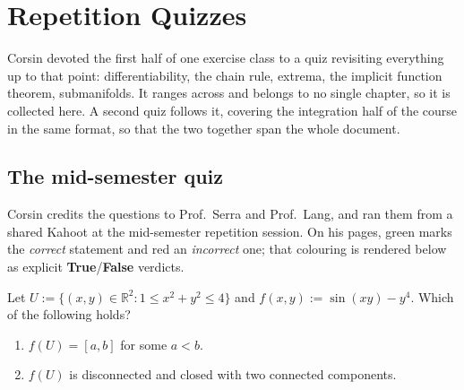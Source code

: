 \chapter{Repetition Quizzes}
\label{ch:repetition_quiz}

Corsin devoted the first half of one exercise class to a quiz revisiting everything up to that
point: differentiability, the chain rule, extrema, the implicit function theorem,
submanifolds. It ranges across  and belongs to no
single chapter, so it is collected here. A second quiz follows it, covering the integration half
of the course in the same format, so that the two together span the whole document.

\section{The mid-semester quiz}
\label{sec:repetition_quiz}

\begin{ainote}
Corsin credits the questions to Prof.\ Serra and Prof.\ Lang, and ran them from a shared Kahoot
at the mid-semester repetition session. On his pages, \textcolor{green!60!black}{green} marks the
\emph{correct} statement and \textcolor{red!80!black}{red} an \emph{incorrect} one; that colouring
is rendered below as explicit \textbf{True}/\textbf{False} verdicts.
\end{ainote}

\begin{question}
\label{q:quiz_q1}
Let $U := \{(x,y) \in \mathbb{R}^2 : 1 \leq x^2+y^2 \leq 4\}$ and
$f(x,y) := \sin(xy) - y^4$. Which of the following holds?
\begin{enumerate}[label=\textbf{(\alph*)}]
  \item $f(U) = [a,b]$ for some $a < b$.
  \item $f(U)$ is disconnected and closed with two connected components.
\end{enumerate}
\end{question}

